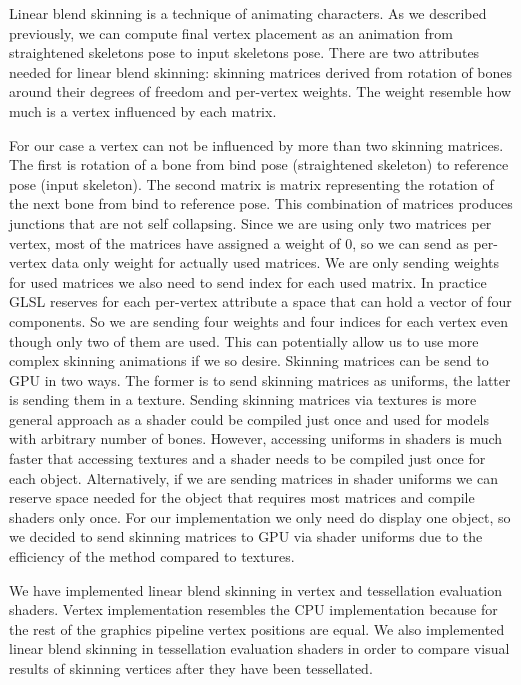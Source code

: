 Linear blend skinning is a technique of animating characters.
As we described previously, we can compute final vertex placement as an animation from straightened skeletons pose to input skeletons pose.
There are two attributes needed for linear blend skinning: skinning matrices derived from rotation of bones around their degrees of freedom and per-vertex weights.
The weight resemble how much is a vertex influenced by each matrix.

For our case a vertex can not be influenced by more than two skinning matrices.
The first is rotation of a bone from bind pose (straightened skeleton) to reference pose (input skeleton).
The second matrix is matrix representing the rotation of the next bone from bind to reference pose.
This combination of matrices produces junctions that are not self collapsing.
Since we are using only two matrices per vertex, most of the matrices have assigned a weight of 0, so we can send as per-vertex data only weight for actually used matrices.
We are only sending weights for used matrices we also need to send index for each used matrix.
In practice GLSL reserves for each per-vertex attribute a space that can hold a vector of four components.
So we are sending four weights and four indices for each vertex even though only two of them are used.
This can potentially allow us to use more complex skinning animations if we so desire.
Skinning matrices can be send to GPU in two ways.
The former is to send skinning matrices as uniforms, the latter is sending them in a texture.
Sending skinning matrices via textures is more general approach as a shader could be compiled just once and used for models with arbitrary number of bones.
However, accessing uniforms in shaders is much faster that accessing textures and a shader needs to be compiled just once for each object.
Alternatively, if we are sending matrices in shader uniforms we can reserve space needed for the object that requires most matrices and compile shaders only once.
For our implementation we only need do display one object, so we decided to send skinning matrices to GPU via shader uniforms due to the efficiency of the method compared to textures.

We have implemented linear blend skinning in vertex and tessellation evaluation shaders.
Vertex implementation resembles the CPU implementation because for the rest of the graphics pipeline vertex positions are equal.
We also implemented linear blend skinning in tessellation evaluation shaders in order to compare visual results of skinning vertices after they have been tessellated.

